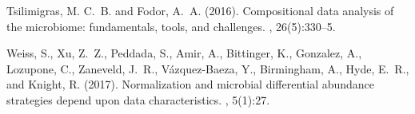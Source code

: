 \documentclass[fleqn,10pt,lineno]{wlpeerj}
\begin{document}
\begin{thebibliography}{}
Tsilimigras, M. C.~B. and Fodor, A.~A. (2016).
\newblock Compositional data analysis of the microbiome: fundamentals, tools,
  and challenges.
, 26(5):330--5.

Weiss, S., Xu, Z.~Z., Peddada, S., Amir, A., Bittinger, K., Gonzalez, A.,
  Lozupone, C., Zaneveld, J.~R., V{\'a}zquez-Baeza, Y., Birmingham, A., Hyde,
  E.~R., and Knight, R. (2017).
\newblock Normalization and microbial differential abundance strategies depend
  upon data characteristics.
, 5(1):27.
\end{thebibliography}
\end{document}
